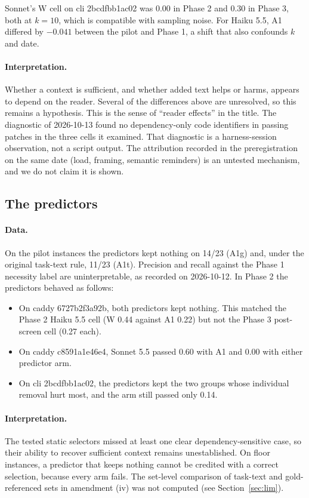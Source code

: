 \documentclass[10pt]{article}
\begin{document}
Sonnet's W cell on cli 2bcdfbb1ac02 was 0.00 in Phase 2 and 0.30 in Phase 3, both at $k=10$, which is compatible with sampling noise. For Haiku 5.5, A1 differed by $-0.041$ between the pilot and Phase 1, a shift that also confounds $k$ and date.

\paragraph{Interpretation.} Whether a context is sufficient, and whether added text helps or harms, appears to depend on the reader. Several of the differences above are unresolved, so this remains a hypothesis. This is the sense of ``reader effects'' in the title. The diagnostic of 2026-10-13 found no dependency-only code identifiers in passing patches in the three cells it examined. That diagnostic is a harness-session observation, not a script output. The attribution recorded in the preregistration on the same date (load, framing, semantic reminders) is an untested mechanism, and we do not claim it is shown.

\subsection{The predictors}

\paragraph{Data.} On the pilot instances the predictors kept nothing on 14/23 (A1g) and, under the original task-text rule, 11/23 (A1t). Precision and recall against the Phase 1 necessity label are uninterpretable, as recorded on 2026-10-12. In Phase 2 the predictors behaved as follows:
\begin{itemize}
\item On caddy 6727b2f3a92b, both predictors kept nothing. This matched the Phase 2 Haiku 5.5 cell (W 0.44 against A1 0.22) but not the Phase 3 post-screen cell (0.27 each).
\item On caddy c8591a1e46e4, Sonnet 5.5 passed 0.60 with A1 and 0.00 with either predictor arm.
\item On cli 2bcdfbb1ac02, the predictors kept the two groups whose individual removal hurt most, and the arm still passed only 0.14.
\end{itemize}

\paragraph{Interpretation.} The tested static selectors missed at least one clear dependency-sensitive case, so their ability to recover sufficient context remains unestablished. On floor instances, a predictor that keeps nothing cannot be credited with a correct selection, because every arm fails. The set-level comparison of task-text and gold-referenced sets in amendment (iv) was not computed (see Section~\ref{sec:lim}).
\end{document}
